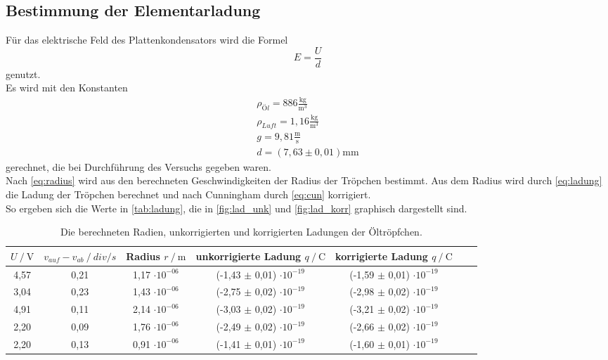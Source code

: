 \subsection*{Bestimmung der Elementarladung}

Für das elektrische Feld des Plattenkondensators wird die Formel
\begin{equation}
  E = \frac{U}{d}
\end{equation}
genutzt.\\
Es wird mit den Konstanten 
\begin{eqnarray}
  \rho_{Öl} = 886 \mathrm{\frac{kg}{m^3}}\\
  \rho_{Luft} = 1,16 \mathrm{\frac{kg}{m^3}}\\
  g = 9,81 \mathrm{\frac{m}{s}} \\
  d = (7,63 \pm 0,01) \mathrm{mm}
\end{eqnarray}
gerechnet, die bei Durchführung des Versuchs gegeben waren. \\

Nach \autoref{eq:radius} wird aus den berechneten Geschwindigkeiten der Radius
der Tröpchen bestimmt. Aus dem Radius wird durch \autoref{eq:ladung} die Ladung der Tröpchen berechnet und nach Cunningham durch \autoref{eq:cun} korrigiert. \\
So ergeben sich die Werte in \autoref{tab:ladung}, die in \autoref{fig:lad_unk} und \autoref{fig:lad_korr} graphisch dargestellt sind.\\

\begin{table}[H]
  \centering
  \caption{Die berechneten Radien, unkorrigierten und korrigierten Ladungen der Öltröpfchen.}
  \begin{tabular}{ccccccc}
    \toprule
    {$U  \mathbin{/} \unit{\volt}$} &
    {$v_{auf} - v_{ab} \mathbin{/} \mathbin{div / s}$} &
    {Radius $r \mathbin{/} \unit{\metre} $} & %
    {unkorrigierte Ladung $q \mathbin{/} \unit{\coulomb}$} &
    {korrigierte Ladung $q \mathbin{/} \unit{\coulomb}$} \\
    \midrule
    4,57  & 0,21  &  1,17 $\cdot 10^{-06}$  &  (-1,43 $\pm$ 0,01) $\cdot 10^{-19}$  & (-1,59 $\pm$ 0,01) $\cdot 10^{-19}$  \\
    3,04  & 0,23  &  1,43 $\cdot 10^{-06}$  &  (-2,75 $\pm$ 0,02) $\cdot 10^{-19}$ & (-2,98 $\pm$ 0,02) $\cdot 10^{-19}$  \\
    4,91  & 0,11  &  2,14 $\cdot 10^{-06}$  &  (-3,03  $\pm$ 0,02) $\cdot 10^{-19}$   & (-3,21  $\pm$ 0,02) $\cdot 10^{-19}$  \\
    2,20  & 0,09  &  1,76 $\cdot 10^{-06}$  &  (-2,49 $\pm$ 0,02) $\cdot 10^{-19}$  & (-2,66  $\pm$ 0,02) $\cdot 10^{-19}$  \\
    2,20  & 0,13  &  0,91 $\cdot 10^{-06}$  &  (-1,41  $\pm$ 0,01) $\cdot 10^{-19}$    & (-1,60  $\pm$ 0,01) $\cdot 10^{-19}$  \\
    \bottomrule
  \end{tabular}
  \label{tab:ladung}
\end{table}


